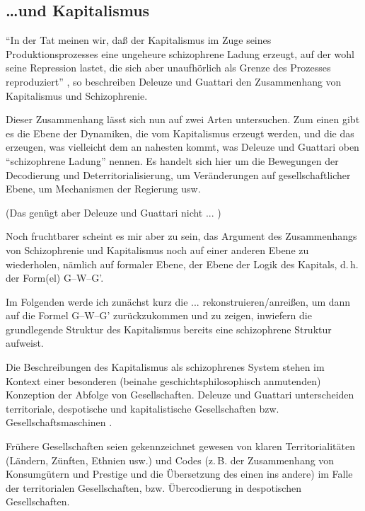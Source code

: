 \documentclass[12pt,
               DIV13,
               paper=a4,
               twoside=false,
               onehalfspacing,
               bibliography=totoc,
               toc=graduated,
               draft,
               ]{scrartcl}
\newcommand{\pc}[2]{\parencite[#1]{#2}}
\newcommand{\vgl}[2]{\parencite[vgl.][#1]{#2}}
\newcommand{\worries}[1]{\ifdraft{\textcolor{blue}{\texttt{(#1)}}}{}}
\newcommand{\gwg}{G--W--G'\xspace}
\newcommand{\dg}{Deleuze und Guattari\xspace}
\begin{document}
\subsection{\dots und Kapitalismus}

"`In der Tat meinen wir, daß der Kapitalismus im Zuge seines
Produktionsprozesses eine ungeheure schizophrene Ladung erzeugt, auf
der wohl seine Repression lastet, die sich aber unaufhörlich als
Grenze des Prozesses reproduziert"' \pc{45}{ao}, so beschreiben
Deleuze und Guattari den Zusammenhang von Kapitalismus und
Schizophrenie.

Dieser Zusammenhang lässt sich nun auf zwei Arten untersuchen. Zum
einen gibt es die Ebene der Dynamiken, die vom Kapitalismus erzeugt
werden, und die das erzeugen, was vielleicht dem an nahesten kommt,
was Deleuze und Guattari oben "`schizophrene Ladung"' nennen. Es
handelt sich hier um die Bewegungen der Decodierung und
Deterritorialisierung, um Veränderungen auf gesellschaftlicher Ebene,
um Mechanismen der Regierung usw.

(Das genügt aber \dg nicht ... )

Noch fruchtbarer scheint es mir aber zu sein, das Argument des
Zusammenhangs von Schizophrenie und Kapitalismus noch auf einer
anderen Ebene zu wiederholen, nämlich auf formaler Ebene, der Ebene
der Logik des Kapitals, d.\,h. der Form(el) \gwg.

Im Folgenden werde ich zunächst kurz die ... rekonstruieren/anreißen,
um dann auf die Formel \gwg zurückzukommen und zu zeigen, inwiefern
die grundlegende Struktur des Kapitalismus bereits eine schizophrene
Struktur aufweist.


Die Beschreibungen des Kapitalismus als schizophrenes System stehen im
Kontext einer besonderen (beinahe geschichtsphilosophisch anmutenden)
Konzeption der Abfolge von Gesellschaften. Deleuze und Guattari
unterscheiden territoriale, despotische und kapitalistische
Gesellschaften bzw. Gesellschaftsmaschinen \vgl{338}{ao}.

Frühere Gesellschaften seien gekennzeichnet gewesen von klaren
Territorialitäten (Ländern, Zünften, Ethnien usw.) und Codes (z.\,B.
der Zusammenhang von Konsumgütern und Prestige und die Übersetzung des
einen ins andere) \vgl{318, 332}{ao} im Falle der territorialen
Gesellschaften, bzw. Übercodierung \worries{BSP} in despotischen
Gesellschaften.
\end{document}
